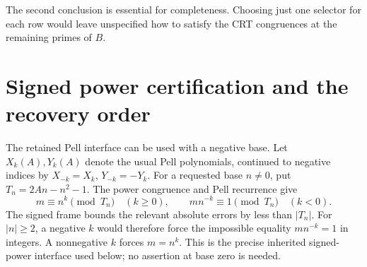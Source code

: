 \documentclass[11pt]{article}
\begin{document}
The second conclusion is essential for completeness. Choosing just one
selector for each row would leave unspecified how to satisfy the CRT
congruences at the remaining primes of $B$.

\section{Signed power certification and the recovery order}\label{sec:bootstrap}

The retained Pell interface can be used with a negative base. Let
$X_k(A),Y_k(A)$ denote the usual Pell polynomials, continued to negative
indices by $X_{-k}=X_k$, $Y_{-k}=-Y_k$. For a requested base $n\ne0$,
put $T_n=2An-n^2-1$. The power congruence and Pell recurrence give
\[
 m\equiv n^k\pmod{T_n}\quad(k\ge0),\qquad
 mn^{-k}\equiv1\pmod{T_n}\quad(k<0).
\]
The signed frame bounds the relevant absolute errors by less than
$|T_n|$. For $|n|\ge2$, a negative $k$ would therefore force the
impossible equality $mn^{-k}=1$ in integers. A nonnegative $k$ forces
$m=n^k$. This is the precise inherited signed-power interface used below;
no assertion at base zero is needed.
\end{document}

